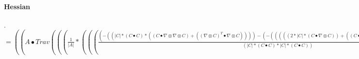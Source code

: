 \documentclass{article}
\begin{document}
\paragraph{Hessian}.\\

$= ((A \bullet Trav((( \frac{1}{|A|}*((( \frac{(-((|C|*(C \bullet C)*((C \bullet  \nabla  \otimes  \nabla  \otimes C)+(( \nabla  \otimes C)^T \bullet  \nabla  \otimes C))))-(-(((((2*|C|*(C \bullet  \nabla  \otimes C))+((C \bullet C)* \frac{(C \bullet  \nabla  \otimes C)}{|C|}))*(C \bullet  \nabla  \otimes C)))))^T)}{(|C|*(C \bullet C)*|C|*(C \bullet C))}*C))+Trav((( \nabla  \otimes C* \frac{-(((C \bullet  \nabla  \otimes C)))}{(|C|*(C \bullet C))})))<2,:,0>+Trav(( \frac{1}{|C|}* \nabla  \otimes  \nabla  \otimes C))<1,2,0>+Trav((( \frac{-(((C \bullet  \nabla  \otimes C)))}{(|C|*(C \bullet C))}* \nabla  \otimes C)))<2,0,1>))+Trav((( \frac{-(((A \bullet  \nabla  \otimes A)))}{(|A|*(A \bullet A))}*((( \frac{-(((C \bullet  \nabla  \otimes C)))}{(|C|*(C \bullet C))}*C))+(( \frac{1}{|C|}* \nabla  \otimes C))^T))))<1,0,:>+(( \frac{(-((|A|*|C|*(A \bullet A)*((A \bullet  \nabla  \otimes  \nabla  \otimes A)+(( \nabla  \otimes A)^T \bullet  \nabla  \otimes A))))-(-(((((|A|*((2*|C|*(A \bullet  \nabla  \otimes A))+((A \bullet A)* \frac{(C \bullet  \nabla  \otimes C)}{|C|})))+(|C|*(A \bullet A)* \frac{(A \bullet  \nabla  \otimes A)}{|A|}))*(A \bullet  \nabla  \otimes A)))))^T)}{(|A|*|C|*(A \bullet A)*|A|*|C|*(A \bullet A))}*C))+Trav((( \nabla  \otimes C* \frac{-(((A \bullet  \nabla  \otimes A)))}{(|A|*|C|*(A \bullet A))})))<2,:,0>))<1,2,0>)+((( \frac{1}{|A|}*((( \frac{-(((C \bullet  \nabla  \otimes C)))}{(|C|*(C \bullet C))}*C))+(( \frac{1}{|C|}* \nabla  \otimes C))^T))+(( \frac{-(((A \bullet  \nabla  \otimes A)))}{(|A|*|C|*(A \bullet A))}*C))) \bullet  \nabla  \otimes A)+( \frac{1}{|A|}*((C \bullet Trav((Trav(( \frac{1}{|C|}* \nabla  \otimes  \nabla  \otimes A))<1,2,0>+Trav((( \frac{-(((C \bullet  \nabla  \otimes C)))}{(|C|*(C \bullet C))}* \nabla  \otimes A)))<2,0,1>))<1,2,0>)+( \frac{1}{|C|}*(( \nabla  \otimes A)^T \bullet  \nabla  \otimes C))))+( \frac{1}{|C|}*((C \bullet  \nabla  \otimes A) \otimes  \frac{-(((A \bullet  \nabla  \otimes A)))}{(|A|*(A \bullet A))})))$
 \\
\end{document}
